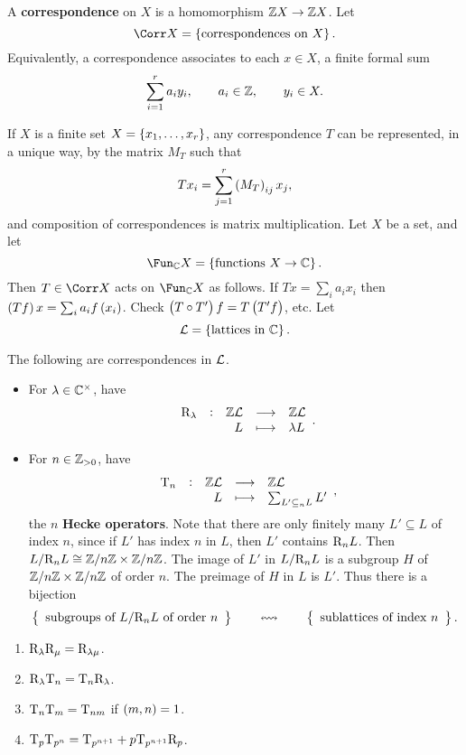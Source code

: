 \begin{definition}
A \textbf{correspondence} on $ X $ is a homomorphism $ \mathbb{Z} X \to \mathbb{Z} X $. Let
$$ \Corr X = \cbr{\text{correspondences on} \ X}. $$
Equivalently, a correspondence associates to each $ x \in X $, a finite formal sum
$$ \sum_{i = 1}^r a_iy_i, \qquad a_i \in \mathbb{Z}, \qquad y_i \in X. $$
\end{definition}

If $ X $ is a finite set $ X = \cbr{x_1, \dots, x_r} $, any correspondence $ T $ can be represented, in a unique way, by the matrix $ M_T $ such that
$$ Tx_i = \sum_{j = 1}^r \br{M_T}_{ij}x_j, $$
and composition of correspondences is matrix multiplication. Let $ X $ be a set, and let
$$ \Fun_\CC X = \cbr{\text{functions} \ X \to \CC}. $$
Then $ T \in \Corr X $ acts on $ \Fun_\CC X $ as follows. If $ Tx = \sum_i a_ix_i $ then $ \br{Tf}x = \sum_i a_if\br{x_i} $. Check $ \br{T \circ T'}f = T\br{T'f} $, etc. Let
$$ \LLL = \cbr{\text{lattices in} \ \CC}. $$

\pagebreak

\begin{example*}
The following are correspondences in $ \mathcal{L} $.
\begin{itemize}
\item For $ \lambda \in \mathbb{C}^\times $, have
$$ \function[\R_\lambda]{\ZZ\LLL}{\ZZ\LLL}{L}{\lambda L}. $$
\item For $ n \in \mathbb{Z}_{> 0} $, have
$$ \function[\T_n]{\ZZ\LLL}{\ZZ\LLL}{L}{\sum_{L' \subseteq_n L} L'}, $$
the $ n $ \textbf{Hecke operators}. Note that there are only finitely many $ L' \subseteq L $ of index $ n $, since if $ L' $ has index $ n $ in $ L $, then $ L' $ contains $ \mathrm{R}_nL $. Then $ L / \mathrm{R}_nL \cong \mathbb{Z} / n\mathbb{Z} \times \mathbb{Z} / n\mathbb{Z} $. The image of $ L' $ in $ L / \mathrm{R}_nL $ is a subgroup $ H $ of $ \mathbb{Z} / n\mathbb{Z} \times \mathbb{Z} / n\mathbb{Z} $ of order $ n $. The preimage of $ H $ in $ L $ is $ L' $. Thus there is a bijection
$$ \correspondence{\text{subgroups of} \ L / \R_nL \ \text{of order} \ n}{\text{sublattices of index} \ n}. $$
\end{itemize}
\end{example*}

\begin{proposition}
\label{prop:correspondence}
\hfill
\begin{enumerate}
\item $ \mathrm{R}_\lambda\mathrm{R}_\mu = \mathrm{R}_{\lambda\mu} $.
\item $ \mathrm{R}_\lambda\mathrm{T}_n = \mathrm{T}_n\mathrm{R}_\lambda $.
\item $ \mathrm{T}_n\mathrm{T}_m = \mathrm{T}_{nm} $ if $ \br{m, n} = 1 $.
\item $ \mathrm{T}_p\mathrm{T}_{p^n} = \mathrm{T}_{p^{n + 1}} + p\mathrm{T}_{p^{n + 1}}\mathrm{R}_p $.
\end{enumerate}
\end{proposition}

